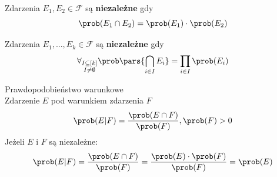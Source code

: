 \begin{definition} Zdarzenia \(E_1, E_2 \in \mathcal{F}\) są \textbf{niezależne} gdy
	\[
		\prob(E_1 \cap E_2) = \prob(E_1) \cdot \prob(E_2)
	\]
\end{definition}

\begin{definition} Zdarzenia \(E_1, ..., E_k \in \mathcal{F}\) są \textbf{niezależne} gdy
	\[
		\forall_{\substack{I \subseteq [k] \\ I \ne \emptyset}} \prob\pars{\bigcap_{i \in I} E_i} = \prod_{i \in I} \prob(E_i)
	\]
\end{definition}

\begin{definition} Prawdopodobieństwo warunkowe \\
	Zdarzenie \(E\) pod warunkiem zdarzenia \(F\)
	\[
		\prob(E|F) = \frac{\prob(E \cap F)}{\prob(F)}, \prob(F) > 0
	\]
	Jeżeli \(E\) i \(F\) są niezależne:
	\[
		\prob(E|F) = \frac{\prob(E \cap F)}{\prob(F)} = \frac{\prob(E)\cdot \prob(F)}{\prob(F)} = \prob(E)
	\]
\end{definition}
